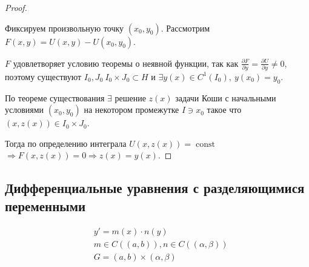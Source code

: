 \documentclass[a4paper]{article}
\theoremstyle{indented}
\theoremstyle{definition}
\theoremstyle{remark}
\DeclareMathOperator{\const}{const}
\begin{document}
\begin{proof} \ 

  Фиксируем произвольную точку $(x_0,y_0)$. Рассмотрим $F(x,y) = U(x,y) - U(x_0,y_0)$.

  $F$ удовлетворяет условию теоремы о неявной функции, так как $\frac{\partial F}{\partial y} = \frac{\partial U}{\partial y} \not  = 0$, поэтому существуют $I_0, J_0 \ I_0 \times J_0 \subset H$ и $\exists y(x) \in  C^1(I_0), \ y(x_0) = y_0$.

  По теореме существования $\exists $ решение $z(x)$ задачи Коши с начальными условиями $(x_0,y_0)$ на некотором промежутке $I \ni x_0$ такое что $(x,z(x)) \in I_0 \times J_0$.

  Тогда по определению интеграла $U(x,z(x)) = \const$ $\Rightarrow F(x,z(x)) = 0 \Rightarrow z(x) = y(x)$.
\end{proof}

\subsection{Дифференциальные уравнения с разделяющимися переменными}

\begin{equation*}
  \begin{aligned}
    & y' = m(x) \cdot n(y) \\
    & m \in C((a,b)), n \in C((\alpha, \beta)) \\
    & G = (a,b) \times (\alpha, \beta)
  \end{aligned}
\end{equation*}
\end{document}
